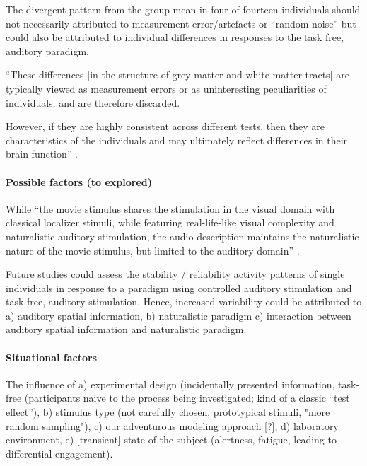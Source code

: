 The divergent pattern from the group mean in four of fourteen individuals should
not necessarily attributed to measurement error/artefacts or ``random noise''
but could also be attributed to individual differences in responses to the task
free, auditory paradigm.

``These differences [in the structure of grey matter and white matter tracts]
are typically viewed as measurement errors or as uninteresting peculiarities of
individuals, and are therefore discarded.

%
However, if they are highly consistent across different tests, then they are
characteristics of the individuals and may ultimately reflect differences in
their brain function'' \citep{kanai2011structural}.



\paragraph{Possible factors (to explored)}

%
While ``the movie stimulus shares the stimulation in the visual domain with
classical localizer stimuli, while featuring real-life-like visual complexity
and naturalistic auditory stimulation, the audio-description maintains the
naturalistic nature of the movie stimulus, but limited to the auditory domain''
\citep{haeusler2022processing}.

%
Future studies could assess the stability / reliability activity patterns of
single individuals in response to a paradigm using controlled auditory
stimulation and task-free, auditory stimulation.
%
Hence, increased variability could be attributed to
%
a) auditory spatial information,
%
b) naturalistic paradigm
%
c) interaction between auditory spatial information and naturalistic paradigm.


\paragraph{Situational factors}

The influence of
%
a) experimental design (incidentally presented information, task-free
(participants naive to the process being investigated; kind of a classic ``test
effect''),
%
b) stimulus type (not carefully chosen, prototypical stimuli, "more random
sampling"),
%
c) our adventurous modeling approach [?],
%
d) laboratory environment,
%
e) [transient] state of the subject (alertness, fatigue, leading to differential
engagement).



